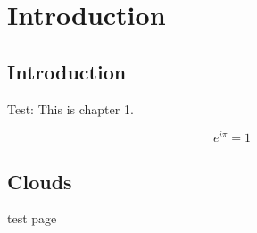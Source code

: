 
\chapter{Introduction}  
\label{ch:chapter1}


\section{Introduction}
Test: This is chapter 1.


\begin{equation}\label{eq:euler}
	e^{i\pi}=1
\end{equation}


\newpage
\section{Clouds}
test page



